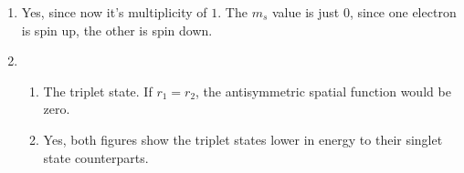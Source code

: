 \documentclass{homework}
\begin{document}
\begin{enumerate}
		\item Yes, since now it's multiplicity of $1$. The $m_s$ value is just $0$, since one electron is spin up, the other is spin down.
		
		\item \begin{enumerate}
			\item The triplet state. If $r_1 = r_2$, the antisymmetric spatial function would be zero.
			
			\item Yes, both figures show the triplet states lower in energy to their singlet state counterparts.
		\end{enumerate}
	\end{enumerate}
\end{document}
